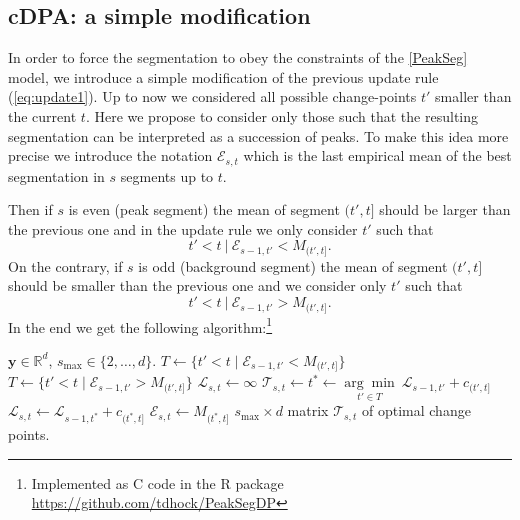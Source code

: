 \documentclass{article}
\newcommand{\RR}{\mathbb R}
\begin{document}
\subsection{cDPA: a simple modification}
\label{sec:constrained-dp}

In order to force the segmentation to obey the constraints of the
\ref{PeakSeg} model, we introduce a simple modification of the
previous update rule (\ref{eq:update1}). %
Up to now we considered all possible change-points $t'$ smaller than
the current $t$. Here we propose to consider only those such that the
resulting segmentation can be interpreted as a succession of
peaks. To make this idea more precise we introduce the notation
$\mathcal{E}_{s,t}$ which is the last empirical mean of the best
segmentation in $s$ segments up to $t$.  

Then if $s$ is even (peak segment) the mean of segment $(t', t]$
should be larger than the previous one and in the update rule we only
consider $t'$ such that
\begin{equation}
  \label{eq:even}
   t' < t \ | \ \mathcal{E}_{s-1,t'} < M_{(t', t]}.
\end{equation}
On the contrary, if $s$ is odd (background segment) the mean of
segment $(t', t]$ should be smaller than the previous one and we
consider only $t'$ such that
\begin{equation}
  \label{eq:odd}
   t' < t \ | \ \mathcal{E}_{s-1,t'} > M_{(t', t]}.
\end{equation}
In the end we get the following algorithm:\footnote{Implemented as C
  code in the R package\\ \url{https://github.com/tdhock/PeakSegDP}}

\begin{algorithm}[H]
\begin{algorithmic}[1]
\REQUIRE $\mathbf y\in\RR^d$, $s_{\text{max}}\in\{2, \dots, d\}$.
\STATE $T \gets \{  t' < t \mid \mathcal{E}_{s-1,t'} < M_{(t', t]} \}$
\ELSE
\STATE $T \gets \{ t' < t \mid \mathcal{E}_{s-1,t'} > M_{(t', t]} \}$
\ENDIF
{}
\STATE ${ \mathcal L}_{s,t} \gets \infty$
\ELSE
\STATE $ \mathcal T_{s, t}\gets t^* \gets
\underset{
  t'\in T
}{\arg \min}\  {\mathcal{L}}_{s-1,t'} + c_{(t',t]}$
\STATE $ {\mathcal{L}}_{s,t} \gets 
{\mathcal{L}}_{s-1,t^*} + c_{(t^*,t]} $
\STATE $\mathcal{E}_{s,t} \gets M_{(t^*, t]}$
\ENDIF
\ENDFOR
\ENDFOR
\RETURN $s_{\text{max}}\times d$ matrix $\mathcal T_{s, t}$ of optimal change points.
\caption{Constrained dynamic programming (cDPA) 
}
\end{algorithmic}\label{algo:v2}
\end{algorithm}
\end{document}
